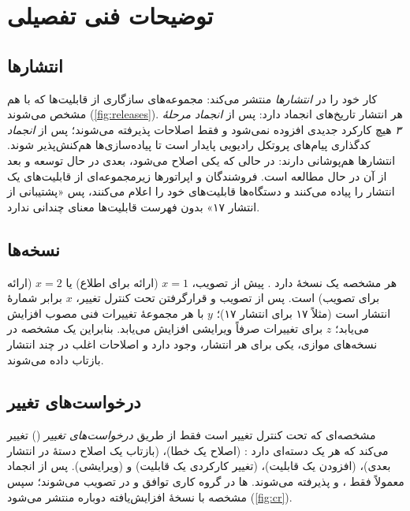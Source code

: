 \documentclass[11pt,a4paper]{article}
\begin{document}
\section{توضیحات فنی تفصیلی}

\subsection{انتشارها}
 کار خود را در \emph{انتشارها} منتشر می‌کند: مجموعه‌های سازگاری از قابلیت‌ها که با هم مشخص می‌شوند
(\cref{fig:releases}). هر انتشار تاریخ‌های انجماد دارد: پس از \emph{انجماد مرحلهٔ ۳} هیچ کارکرد جدیدی افزوده نمی‌شود و فقط
اصلاحات پذیرفته می‌شوند؛ پس از \emph{انجماد } کدگذاری پیام‌های پروتکل رادیویی پایدار است تا پیاده‌سازی‌ها
هم‌کنش‌پذیر شوند. انتشارها هم‌پوشانی دارند: در حالی که یکی اصلاح می‌شود، بعدی در حال توسعه و بعد از آن در حال مطالعه است.
فروشندگان و اپراتورها زیرمجموعه‌ای از قابلیت‌های یک انتشار را پیاده می‌کنند و دستگاه‌ها قابلیت‌های خود را اعلام می‌کنند،
پس «پشتیبانی از انتشار ۱۷» بدون فهرست قابلیت‌ها معنای چندانی ندارد.

\begin{acnfigure}
  \caption{برخی انتشارهای  با قابلیت‌های شاخص. سال‌ها زمان تقریبی تکمیل را نشان می‌دهند؛ رنگ فیروزه‌ای انتشارهای نسل پنجم است.}
  \label{fig:releases}
\end{acnfigure}

\subsection{نسخه‌ها}
هر مشخصه یک نسخهٔ  دارد \cite{tr21900}. پیش از تصویب، $x = 1$ (ارائه برای اطلاع) یا $x = 2$ (ارائه برای تصویب)
است. پس از تصویب و قرارگرفتن تحت کنترل تغییر، $x$ برابر شمارهٔ انتشار است (مثلاً ۱۷ برای انتشار ۱۷)؛ $y$ با هر مجموعهٔ
تغییرات فنی مصوب افزایش می‌یابد؛ $z$ برای تغییرات صرفاً ویرایشی افزایش می‌یابد. بنابراین یک مشخصه در نسخه‌های موازی، یکی
برای هر انتشار، وجود دارد و اصلاحات اغلب در چند انتشار بازتاب داده می‌شوند.

\subsection{درخواست‌های تغییر}
مشخصه‌ای که تحت کنترل تغییر است فقط از طریق \emph{درخواست‌های تغییر} () تغییر می‌کند که هر یک دسته‌ای دارد
\cite{tr21900}: \textbf{} (اصلاح یک خطا)، \textbf{} (بازتاب یک اصلاح دستهٔ  در انتشار بعدی)،
\textbf{} (افزودن یک قابلیت)، \textbf{} (تغییر کارکردی یک قابلیت) و \textbf{} (ویرایشی). پس از انجماد معمولاً
فقط ،  و  پذیرفته می‌شوند. ها در گروه کاری توافق و در  تصویب می‌شوند؛ سپس مشخصه با نسخهٔ
افزایش‌یافته دوباره منتشر می‌شود (\cref{fig:cr}).
\end{document}
